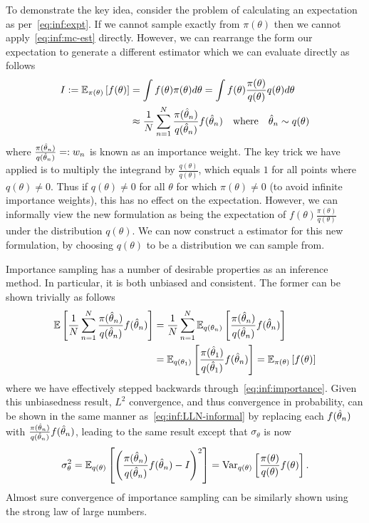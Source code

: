 To demonstrate the key idea, consider the problem of calculating an expectation as
per~\eqref{eq:inf:expt}.  If we cannot sample exactly from $\pi(\theta)$ then we cannot
apply~\eqref{eq:inf:mc-est} directly.  However, we can rearrange the form our expectation
to generate a different \mc estimator which we can evaluate directly as follows
\begin{align}
	I:=\mathbb{E}_{\pi(\theta)} \left[f(\theta)\right] &=\int f(\theta) \pi(\theta) d\theta 
	= \int f(\theta) \frac{\pi(\theta)}{q(\theta)} q(\theta) d\theta \nonumber \\
	&\approx \frac{1}{N} \sum_{n=1}^{N} \frac{\pi(\hat{\theta}_n)}{q(\hat{\theta}_n)} f(\hat{\theta}_n)
	\quad \text{where} \quad \hat{\theta}_n \sim q(\theta) 	\label{eq:inf:importance}
\end{align}
where $\frac{\pi(\hat{\theta}_n)}{q(\hat{\theta}_n)} =: w_n$ is known as an importance weight.
The key trick we have applied is to multiply the integrand by $\frac{q(\theta)}{q(\theta)}$, which
equals $1$
for all points where $q(\theta) \neq 0$.  Thus if $q(\theta) \neq 0$ for all $\theta$ for which
$\pi(\theta) \neq 0$ (to avoid infinite importance weights), this has no effect on the 
expectation.  However, we can informally view the new
formulation as being the expectation of $f(\theta) \frac{\pi(\theta)}{q(\theta)}$ under the
distribution $q(\theta)$.  We can now construct a \mc estimator for this new formulation, 
by choosing $q(\theta)$ to be a distribution we can sample from.

Importance sampling has a number of desirable properties as an inference method.
In particular, it is both unbiased and consistent.  The former can be shown trivially
as follows
\begin{align}
\mathbb{E} \left[\frac{1}{N} \sum_{n=1}^{N} \frac{\pi(\hat{\theta}_n)}{q(\hat{\theta}_n)} f(\hat{\theta}_n)\right] &=
\frac{1}{N} \sum_{n=1}^{N} \mathbb{E} _{q(\theta_n)}\left[\frac{\pi(\hat{\theta}_n)}{q(\hat{\theta}_n)} f(\hat{\theta}_n)\right] \nonumber \\
&=\mathbb{E} _{q(\theta_1)}\left[\frac{\pi(\hat{\theta}_1)}{q(\hat{\theta}_1)} f(\hat{\theta}_n)\right] =
\mathbb{E} _{\pi(\theta)}\left[f(\theta)\right]
\end{align}
where we have effectively stepped backwards through~\eqref{eq:inf:importance}.
Given this unbiasedness result, $L^2$ convergence, and thus convergence in probability,
can be shown in the same manner as~\eqref{eq:inf:LLN-informal} by replacing
each $f(\hat{\theta}_n)$ with $\frac{\pi(\hat{\theta}_n)}{q(\hat{\theta}_n)} f(\hat{\theta}_n)$, leading to the
same result except that $\sigma_{\theta}$ is now
\begin{align}
\label{eq:inf:sigma-imp}
\sigma_{\theta}^2 = \mathbb{E}_{q(\theta)} \left[\left(\frac{\pi(\hat{\theta}_n)}{q(\hat{\theta}_n)} f(\hat{\theta}_n)-I\right)^2\right]
= \mathrm{Var}_{q(\theta)} \left[\frac{\pi(\theta)}{q(\theta)} f(\theta)\right].
\end{align}
Almost sure convergence of importance sampling can be similarly shown using
the strong law of large numbers.

